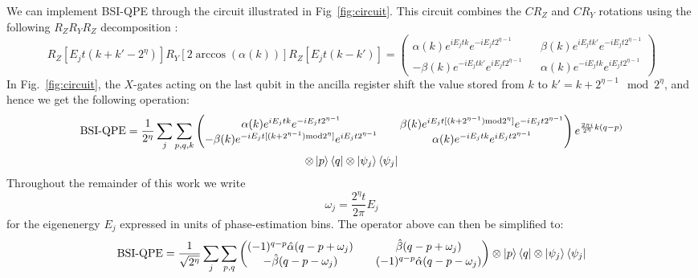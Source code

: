 \documentclass[aps,floatfix,10pt,amssymb,amsfont,amsmath,superscriptaddress,float,nofootinbib,longbibliography,nobalancelastpage,twocolumn]{revtex4-2}
\begin{document}
\begin{widetext}
We can implement BSI-QPE through the circuit illustrated in Fig~\ref{fig:circuit}. This circuit combines the  $CR_Z$ and $CR_Y$ rotations using the following $R_ZR_YR_Z$ decomposition \cite{Nielsen_Chuang_2010}: 
\begin{equation}
\label{eq:euler}
    R_Z[E_jt(k+k'-2^{\eta})]R_Y[2\arccos(\alpha(k))]R_Z[E_jt(k-k')] = \begin{pmatrix}
        \alpha(k)e^{iE_jtk}e^{-iE_jt2^{\eta-1}} && \beta(k)e^{iE_jt k'}e^{-iE_jt2^{\eta-1}}\\
        -\beta (k)e^{-iE_jt k'}e^{iE_jt2^{\eta-1}} && \alpha(k)e^{-iE_jtk}e^{iE_jt2^{\eta-1}}
    \end{pmatrix}
\end{equation}
In Fig.~\ref{fig:circuit}, the $X$-gates acting on the last qubit in the ancilla register shift the value stored from $k$ to $k'= k+2^{\eta-1} \mod 2^{\eta}$, and hence we get the following operation:
\begin{multline}
        \text{BSI-QPE} = \frac{1}{2^{\eta}}\sum_j\sum_{p,q,k} \begin{pmatrix}
        \alpha(k)e^{iE_jtk}e^{-iE_jt2^{\eta-1}} && \beta(k)e^{iE_jt[(k+2^{\eta-1})\text{mod} 2^{\eta}]}e^{-iE_jt2^{\eta-1}}\\
        -\beta (k)e^{-iE_jt[(k+2^{\eta-1})\text{mod} 2^{\eta}]}e^{iE_jt2^{\eta-1}} && \alpha(k)e^{-iE_jtk}e^{iE_jt2^{\eta-1}}
    \end{pmatrix}e^{\frac{2\pi i}{2^{\eta}}k(q-p)} \\\otimes\ket{p}\bra{q}\otimes\ket{\psi_j}\bra{\psi_j}
\end{multline}
Throughout the remainder of this work we write
\begin{equation}
    \omega_j = \frac{2^{\eta}t}{2\pi}E_j
    \label{eq:omegadef}
\end{equation}
for the eigenenergy $E_j$ expressed in units of phase-estimation bins. The operator above can then be simplified to:
\begin{equation}
    \text{BSI-QPE} = \frac{1}{\sqrt{2^{\eta}}}\sum_j\sum_{p,q} \begin{pmatrix}
        (-1)^{q-p}\hat\alpha(q-p+\omega_{j}) && \hat\beta(q-p+\omega_{j})\\
        -\hat\beta (q-p-\omega_{j}) && (-1)^{q-p}\hat\alpha(q-p-\omega_{j})
    \end{pmatrix}\otimes\ket{p}\bra{q}\otimes\ket{\psi_j}\bra{\psi_j}
\end{equation}

\end{widetext}
\end{document}
